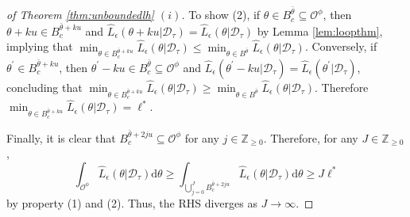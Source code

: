 \documentclass{amsart}
\begin{document}
\begin{proof}[of Theorem \ref{thm:unboundedlh} $(i)$]
To show (2), if $\theta \in B_c^{\bar{\theta}}  \subseteq \mathcal{O}^\phi$, then $\theta + ku \in B_c^{\bar{\theta}+ku}$ and $\hat{L}_\epsilon(\theta + ku|\mathcal{D}_\tau) = \hat{L}_\epsilon(\theta|\mathcal{D}_\tau)$ by Lemma \ref{lem:loopthm}, implying that $\min_{\theta \in B_c^{\bar{\theta}+ku}} \hat{L}_\epsilon(\theta|\mathcal{D}_\tau) \leq \min_{\theta \in B^{\bar{\theta}}} \hat{L}_\epsilon(\theta|\mathcal{D}_\tau)$. Conversely, if $\theta^\prime \in B_c^{\bar{\theta}+ku}$, then $\theta^\prime - ku \in B^{\bar{\theta}}_c \subseteq \mathcal{O}^\phi$ and $\hat{L}_\epsilon(\theta^\prime - ku|\mathcal{D}_\tau) = \hat{L}_\epsilon(\theta^\prime|\mathcal{D}_\tau)$, concluding that $\min_{\theta \in B_c^{\bar{\theta}+ku}} \hat{L}_\epsilon(\theta|\mathcal{D}_\tau) \geq \min_{\theta \in B^{\bar{\theta}}} \hat{L}_\epsilon(\theta|\mathcal{D}_\tau)$. Therefore $\min_{\theta \in B_c^{\bar{\theta} + ku}} \hat{L}_\epsilon(\theta|\mathcal{D}_\tau) = \ell^*$.

Finally, it is clear that $B_c^{\bar{\theta}+2ju} \subseteq \mathcal{O}^\phi$ for any $j \in \mathbb{Z}_{\geq 0}$. Therefore, for any $J \in \mathbb{Z}_{\geq 0}$,
$$\int_{\mathcal{O}^\phi} \hat{L}_\epsilon(\theta|\mathcal{D}_\tau)\mathrm{d} \theta \geq \int_{\bigcup_{j=0}^J B_c^{\bar{\theta} + 2ju}} \hat{L}_\epsilon(\theta|\mathcal{D}_\tau) \mathrm{d} \theta \geq J\ell^*$$
by property (1) and (2). Thus, the RHS diverges as $J \rightarrow \infty$.
\end{proof}
\end{document}
